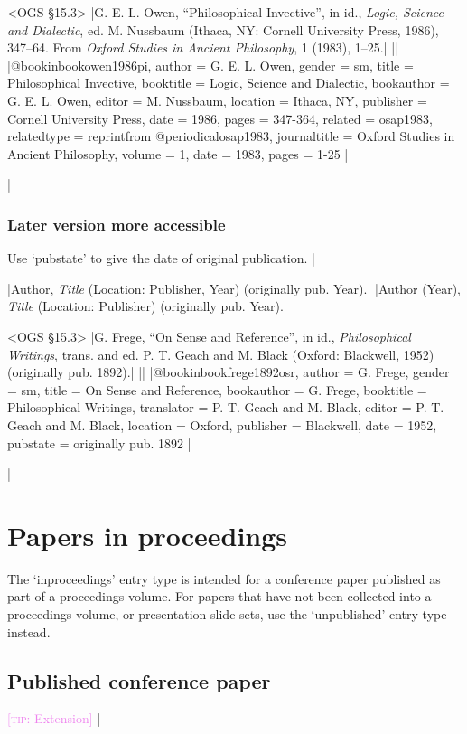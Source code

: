 \documentclass[extrafontsizes,11pt,a4paper,oneside]{memoir}
\newcommand*{\lit}[1]{\textsf{#1}}
\newcommand*{\code}[1]{`\textsf{#1}'}
\newcommand*{\aside}[1]{\textcolor{violet}{[\textsc{tip:} #1]}}
\begin{document}
\bibexample<OGS \S15.3>
|G. E. L. Owen, \enquote{Philosophical Invective}, in id., \emph{Logic, Science and Dialectic}, ed. M. Nussbaum (Ithaca, NY: Cornell University Press, 1986), 347--64. From \emph{Oxford Studies in Ancient Philosophy}, 1 (1983), 1--25.|%
||%
|@bookinbook{owen1986pi,
  author = {G. E. L. Owen},
  gender = {sm},
  title = {Philosophical Invective},
  booktitle = {Logic, Science and Dialectic},
  bookauthor = {G. E. L. Owen},
  editor = {M. Nussbaum},
  location = {Ithaca, NY},
  publisher = {Cornell University Press},
  date = {1986},
  pages = {347-364},
  related = {osap1983},
  relatedtype = {reprintfrom}
}
@periodical{osap1983,
  journaltitle = {Oxford Studies in Ancient Philosophy},
  volume = {1},
  date = {1983},
  pages = {1-25}
}|

\todoc|
\subsection{Later version more accessible}

Use \code{pubstate} to give the date of original publication.
|

\specs
|Author, \emph{Title} (Location: Publisher, Year) (\lit{originally pub.} Year).|%
|Author (Year), \emph{Title} (Location: Publisher) (\lit{originally pub.} Year).|

\bibexample<OGS \S15.3>
|G. Frege, \enquote{On Sense and Reference}, in id., \emph{Philosophical Writings}, trans. and ed. P. T. Geach and M. Black (Oxford: Blackwell, 1952) (originally pub. 1892).|%
||%
|@bookinbook{frege1892osr,
  author = {G. Frege},
  gender = {sm},
  title = {On Sense and Reference},
  bookauthor = {G. Frege},
  booktitle = {Philosophical Writings},
  translator = {P. T. Geach and M. Black},
  editor = {P. T. Geach and M. Black},
  location = {Oxford},
  publisher = {Blackwell},
  date = {1952},
  pubstate = {originally pub\adddotspace 1892}
}|

\todoc|
\chapter{Papers in proceedings}\label{sec:inproceedings}

The \code{inproceedings} entry type is intended for a conference paper published as part of a proceedings volume. For papers that have not been collected into a proceedings volume, or presentation slide sets, use the \code{unpublished} entry type instead.

\section{Published conference paper}
\aside{Extension}
|
\end{document}
